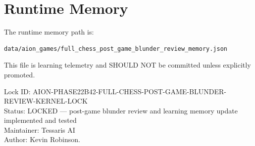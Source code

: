 \documentclass[11pt,a4paper]{article}
\begin{document}
\section{Runtime Memory}

The runtime memory path is:

\begin{verbatim}
data/aion_games/full_chess_post_game_blunder_review_memory.json
\end{verbatim}

This file is learning telemetry and SHOULD NOT be committed unless explicitly promoted.

\bigskip

\noindent
Lock ID: AION-PHASE22B42-FULL-CHESS-POST-GAME-BLUNDER-REVIEW-KERNEL-LOCK\\
Status: LOCKED --- post-game blunder review and learning memory update implemented and tested\\
Maintainer: Tessaris AI\\
Author: Kevin Robinson.
\end{document}
